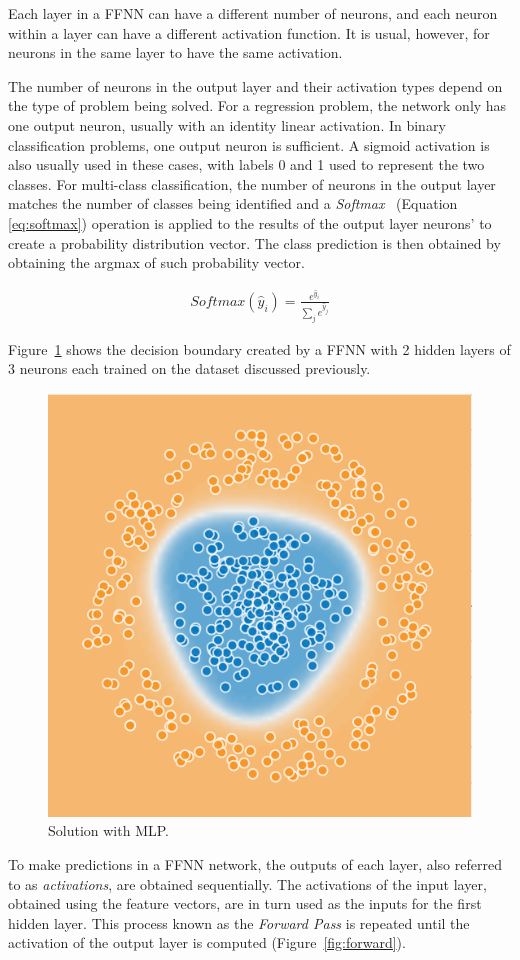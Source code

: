 Each layer in a FFNN can have a different number of neurons, and each neuron
within a layer can have a different activation function. It is usual, however,
for neurons in the same layer to have the same activation. 

The number of neurons in the output layer and their activation types depend on
the type of problem being solved. For a regression problem, the network only has
one output neuron, usually with an identity linear activation. In binary
classification problems, one output neuron is sufficient. A sigmoid activation
is also usually used in these cases, with labels 0 and 1 used to represent the
two classes. For multi-class classification, the number of neurons in the output
layer matches the number of classes being identified and a \textit{Softmax}~\cite{pattern_recognition}
(Equation \ref{eq:softmax}) operation is applied to the results of the output
layer neurons' to create a probability distribution vector. The class prediction
is then obtained by obtaining the argmax of such probability vector.

\begin{align}
    \textit{Softmax}(\hat{y}_i) = \frac{e^{\hat{y}_i}}{\sum\limits_j e^{\hat{y}_j}}
    \label{eq:softmax}
\end{align}

Figure~\ref{fig:mlp_solved} shows the decision boundary created by a FFNN with 2
hidden layers of 3 neurons each trained on the dataset discussed previously.

\begin{figure}[!htbp]
    \centering
    \includegraphics[width=.35\textwidth]{Images/circles_solved.png}
    \caption{Solution with MLP.}
    \label{fig:mlp_solved}
\end{figure}

To make predictions in a FFNN network, the outputs of each layer, also referred
to as \textit{activations}, are obtained sequentially. The activations of the
input layer, obtained using the feature vectors, are in turn used as the inputs
for the first hidden layer. This process known as the \textit{Forward Pass} is
repeated until the activation of the output layer is computed
(Figure~\ref{fig:forward}).

